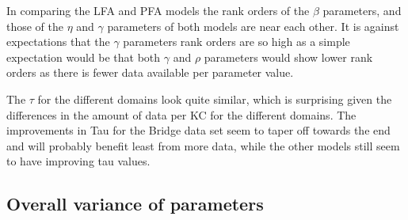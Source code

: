 \documentclass{scrartcl}
\begin{document}
In comparing the LFA and PFA models the rank orders of the $\beta$ parameters, and those of the $\eta$ and $\gamma$ parameters of both models are near each other. It is against expectations that the $\gamma$ parameters rank orders are so high as a simple expectation would be that both $\gamma$ and $\rho$ parameters would show lower rank orders as there is fewer data available per parameter value.
 
The $\tau$ for the different domains look quite similar, which is surprising given the differences in the amount of data per KC for the different domains. The improvements in Tau for the Bridge data set seem to taper off towards the end and will probably benefit least from more data, while the other models still seem to have improving tau values. 
\subsection{Overall variance of parameters}
\label{sec:varresults}
\end{document}
